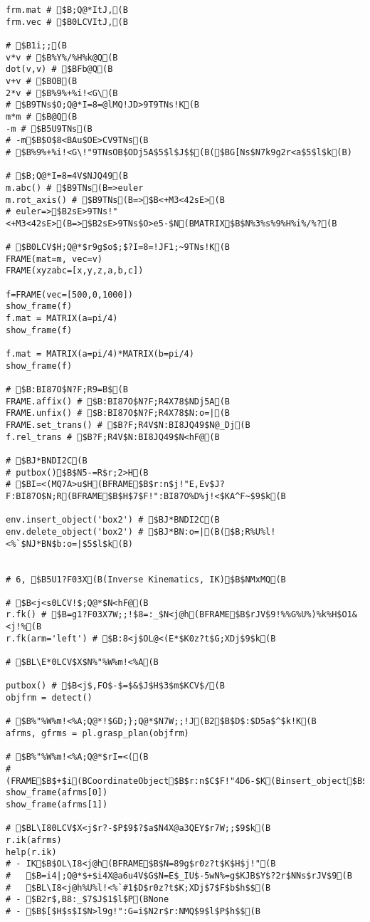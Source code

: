\documentclass[11pt]{jreport}
\begin{document}
{{{{{{{{{{{{{{{\begin{verbatim}
frm.mat # $B;Q@*ItJ,(B
frm.vec # $B0LCVItJ,(B

# $B1i;;(B
v*v # $B%Y%/%H%k@Q(B
dot(v,v) # $BFb@Q(B
v+v # $BOB(B
2*v # $B%9%+%i!<G\(B
# $B9TNs$O;Q@*I=8=@lMQ!JD>9T9TNs!K(B
m*m # $B@Q(B
-m # $B5U9TNs(B
# -m$B$O$8<BAu$OE>CV9TNs(B
# $B%9%+%i!<G\!"9TNsOB$ODj5A$5$l$J$$(B($BG[Ns$N7k9g2r<a$5$l$k(B)

# $B;Q@*I=8=4V$NJQ49(B
m.abc() # $B9TNs(B=>euler
m.rot_axis() # $B9TNs(B=>$B<+M3<42sE>(B
# euler=>$B2sE>9TNs!"<+M3<42sE>(B=>$B2sE>9TNs$O>e5-$N(BMATRIX$B$N%3%s%9%H%i%/%?(B

# $B0LCV$H;Q@*$r9g$o$;$?I=8=!JF1;~9TNs!K(B
FRAME(mat=m, vec=v)
FRAME(xyzabc=[x,y,z,a,b,c])

f=FRAME(vec=[500,0,1000])
show_frame(f)
f.mat = MATRIX(a=pi/4)
show_frame(f)

f.mat = MATRIX(a=pi/4)*MATRIX(b=pi/4)
show_frame(f)

# $B:BI87O$N?F;R9=B$(B
FRAME.affix() # $B:BI87O$N?F;R4X78$NDj5A(B
FRAME.unfix() # $B:BI87O$N?F;R4X78$N:o=|(B
FRAME.set_trans() # $B?F;R4V$N:BI8JQ49$N@_Dj(B
f.rel_trans # $B?F;R4V$N:BI8JQ49$N<hF@(B

# $BJ*BNDI2C(B
# putbox()$B$N5-=R$r;2>H(B
# $BI=<(MQ7A>u$H(BFRAME$B$r:n$j!"E,Ev$J?F:BI87O$N;R(BFRAME$B$H$7$F!":BI87O%D%j!<$KA^F~$9$k(B

env.insert_object('box2') # $BJ*BNDI2C(B
env.delete_object('box2') # $BJ*BN:o=|(B($B;R%U%l!<%`$NJ*BN$b:o=|$5$l$k(B)


# 6, $B5U1?F03X(B(Inverse Kinematics, IK)$B$NMxMQ(B

# $B<j<s0LCV!$;Q@*$N<hF@(B
r.fk() # $B=g1?F03X7W;;!$8=:_$N<j@h(BFRAME$B$rJV$9!%%G%U%)%k%H$O1&<j!%(B
r.fk(arm='left') # $B:8<j$OL@<(E*$K0z?t$G;XDj$9$k(B

# $BL\E*0LCV$X$N%"%W%m!<%A(B

putbox() # $B<j$,FO$-$=$&$J$H$3$m$KCV$/(B
objfrm = detect()

# $B%"%W%m!<%A;Q@*!$GD;};Q@*$N7W;;!J(B2$B$D$:$D5a$^$k!K(B
afrms, gfrms = pl.grasp_plan(objfrm)

# $B%"%W%m!<%A;Q@*$rI=<((B
# (FRAME$B$+$i(BCoordinateObject$B$r:n$C$F!"4D6-$K(Binsert_object$B$9$k(B)
show_frame(afrms[0])
show_frame(afrms[1])

# $BL\I80LCV$X<j$r?-$P$9$?$a$N4X@a3QEY$r7W;;$9$k(B
r.ik(afrms)
help(r.ik)
# - IK$B$OL\I8<j@h(BFRAME$B$N=89g$r0z?t$K$H$j!"(B
#   $B=i4|;Q@*$+$i4X@a6u4V$G$N=E$_IU$-5wN%=g$KJB$Y$?2r$NNs$rJV$9(B
#   $BL\I8<j@h%U%l!<%`#1$D$r0z?t$K;XDj$7$F$b$h$$(B
# - $B2r$,B8:_$7$J$1$l$P(BNone
# - $B$[$H$s$I$N>l9g!":G=i$N2r$r:NMQ$9$l$P$h$$(B


\end{verbatim}}}}}}}}}}}}}}}}
\end{document}
